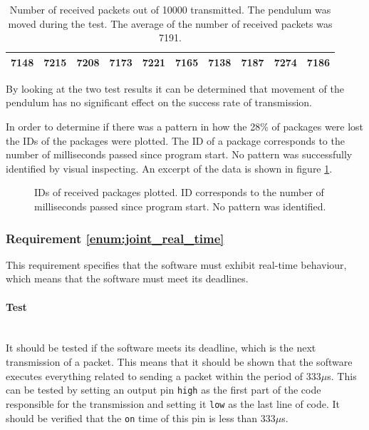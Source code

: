 {\begin{table}[h]
\centering
\begin{tabular}{|l|l|l|l|l|l|l|l|l|l|}
\hline
7148 & 7215 & 7208 & 7173 & 7221 & 7165 & 7138 & 7187 & 7274 & 7186 \\ \hline
\end{tabular}
\caption[Number of received packets with movement.]{Number of received packets out of 10000 transmitted. The pendulum was moved during the test. The average of the number of received packets was 7191.}
\label{tab:received_moved}
\end{table}
By looking at the two test results it can be determined that movement of the pendulum has no significant effect on the success rate of transmission.

In order to determine if there was a pattern in how the 28\% of packages were lost the IDs of the packages were plotted.
The ID of a package corresponds to the number of milliseconds passed since program start.
No pattern was successfully identified by visual inspecting.
An excerpt of the data is shown in figure \ref{fig:received_packets}.

\begin{figure}[h]
	\centering
    
	\caption[IDs of received packages plotted.]{IDs of received packages plotted. ID corresponds to the number of milliseconds passed since program start. No pattern was identified.}
	\label{fig:received_packets}
\end{figure}

\subsubsection{Requirement \ref{enum:joint_real_time}} %
\label{ssub:requirement_enum_joint_real_time}
This requirement specifies that the software must exhibit real-time behaviour, which means that the software must meet its deadlines.

\paragraph{Test}~\\
It should be tested if the software meets its deadline, which is the next transmission of a packet.
This means that it should be shown that the software executes everything related to sending a packet within the period of 333$\mu$s.
This can be tested by setting an output pin \texttt{high} as the first part of the code responsible for the transmission and setting it \texttt{low} as the last line of code.
It should be verified that the \texttt{on} time of this pin is less than 333$\mu$s.

}
